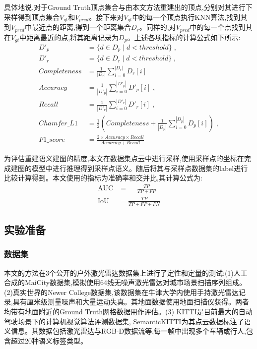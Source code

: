 具体地说,对于Ground Truth顶点集合与由本文方法重建出的顶点,分别对其进行下采样得到顶点集合$V_{gt}$和$V_{pred}$。接下来对$V_{gt}$中的每一个顶点执行KNN算法,找到其到$V_{pred}$中最近点的距离,得到一个距离集合$D_{r}$。同样的,对$V_{pred}$中的每一个点找到其在$V_{gt}$中距离最近的点,将其距离记录为$D_{p}$。上述各项指标的计算公式如下所示:
\begin{equation*}
\begin{alignedat}{2}
D'_{p} &= \{d \in D_{p} \mid d < threshold\}\;,\\
D'_{r} &= \{d \in D_r\mid d<threshold\}\;,\\
Completeness &= \frac{1}{|D_{r}|}\sum_{i=0}^{|D_{r}|}D_{r}[i]\;\\
Accuracy&= \frac{1}{|D'_{p}|}\sum_{i=0}^{|D'_{p}|}D'_{p}[i]\;,\\
Recall &=\frac{1}{|D'_{r}|}\sum_{i=0}^{|D'_{r}|}D'_{r}[i]\;,\\
Chamfer\_L1 &= \frac{1}{2}\left(Completeness + \frac{1}{|D_{p}|}\sum_{i=0}^{|D_{p}|}D_{p}[i]\right)\;,\\
F1\_score &= \frac{2\times Accuracy\times Recall}{Accuracy + Recall}
\end{alignedat}
\end{equation*}

为评估重建语义建图的精度,本文在数据集点云中进行采样,使用采样点的坐标在完成建图的模型中进行推理得到采样点语义。随后将其与采样点数据集的label进行比较计算得到。本文使用的指标为准确率和交并比,其计算公式为:
\begin{equation*}
    \begin{alignedat}{2}
    \mbox{AUC} &=\quad\;\frac{TP}{TP+FP}\\
    \mbox{IoU} &=\frac{TP}{TP + FP + FN}
    \end{alignedat}
\end{equation*}
\subsection{实验准备}
\subsubsection{数据集}
本文的方法在3个公开的户外激光雷达数据集上进行了定性和定量的测试:(1)人工合成的MaiCity数据集\cite{maicity},模拟使用64线无噪声激光雷达对城市场景扫描序列组成。(2)真实世界的Newer College数据集\cite{ncd},该数据集在牛津大学内使用手持激光雷达记录,具有厘米级测量噪声和大量运动失真。其地面数据使用地面扫描仪获得。两者均带有地面附近的Ground Truth网格数据用作评估。(3) KITTI\cite{KITTI}是目前最大的自动驾驶场景下的计算机视觉算法评测数据集, SemanticKITTI\cite{SemanticKITTI}为其点云数据标注了语义信息。其数据包括激光雷达与RGB-D数据流等,每一帧中出现多个车辆或行人,包含超过20种语义标签类型。
